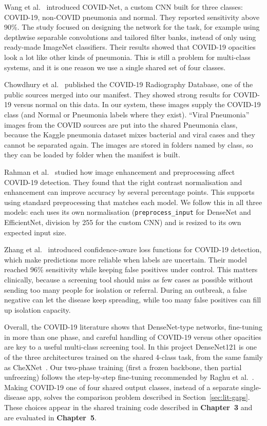 Wang et al.~\cite{wang2020} introduced COVID-Net, a custom CNN built for three classes: COVID-19, non-COVID pneumonia and normal. They reported sensitivity above 90\%. The study focused on designing the network for the task, for example using depthwise separable convolutions and tailored filter banks, instead of only using ready-made ImageNet classifiers. Their results showed that COVID-19 opacities look a lot like other kinds of pneumonia. This is still a problem for multi-class systems, and it is one reason we use a single shared set of four classes.

Chowdhury et al.~\cite{chowdhury2020} published the COVID-19 Radiography Database, one of the public sources merged into our manifest. They showed strong results for COVID-19 versus normal on this data. In our system, these images supply the COVID-19 class (and Normal or Pneumonia labels where they exist). ``Viral Pneumonia'' images from the COVID sources are put into the shared Pneumonia class, because the Kaggle pneumonia dataset mixes bacterial and viral cases and they cannot be separated again. The images are stored in folders named by class, so they can be loaded by folder when the manifest is built.

Rahman et al.~\cite{rahman2021} studied how image enhancement and preprocessing affect COVID-19 detection. They found that the right contrast normalisation and enhancement can improve accuracy by several percentage points. This supports using standard preprocessing that matches each model. We follow this in all three models: each uses its own normalisation (\texttt{preprocess\_input} for DenseNet and EfficientNet, division by 255 for the custom CNN) and is resized to its own expected input size.

Zhang et al.~\cite{zhang2020} introduced confidence-aware loss functions for COVID-19 detection, which make predictions more reliable when labels are uncertain. Their model reached 96\% sensitivity while keeping false positives under control. This matters clinically, because a screening tool should miss as few cases as possible without sending too many people for isolation or referral. During an outbreak, a false negative can let the disease keep spreading, while too many false positives can fill up isolation capacity.

Overall, the COVID-19 literature shows that DenseNet-type networks, fine-tuning in more than one phase, and careful handling of COVID-19 versus other opacities are key to a useful multi-class screening tool. In this project DenseNet121 is one of the three architectures trained on the shared 4-class task, from the same family as CheXNet~\cite{rajpurkar2017}. Our two-phase training (first a frozen backbone, then partial unfreezing) follows the step-by-step fine-tuning recommended by Raghu et al.~\cite{raghu2019}. Making COVID-19 one of four shared output classes, instead of a separate single-disease app, solves the comparison problem described in Section~\ref{sec:lit-gaps}. These choices appear in the shared training code described in \textbf{Chapter~3} and are evaluated in \textbf{Chapter~5}.

